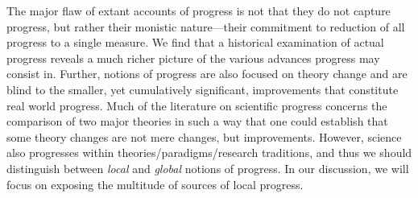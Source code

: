 The major flaw of extant accounts of progress is not that they do not capture progress, but rather their monistic nature---their commitment to reduction of all progress to a single measure.
We find that a historical examination of actual progress reveals a much richer picture of the various advances progress may consist in. 
Further, notions of progress are also focused on theory change and are blind to the smaller, yet cumulatively significant, improvements that constitute real world progress. 
Much of the literature on scientific progress concerns the comparison of two major theories in such a way that one could establish that some theory changes are not mere changes, but improvements. 
However, science also progresses within theories/paradigms/research traditions, and thus we should distinguish between \textit{local} and \textit{global} notions of progress. 
In our discussion, we will focus on exposing the multitude of sources of local progress. 

